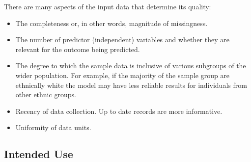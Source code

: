 \documentclass[11pt]{article}
\begin{document}
There are many aspects of the input data that determine its quality: \begin{itemize}
\item The completeness or, in other words, magnitude of missingness. 
\item The number of predictor (independent) variables and whether they are relevant for the outcome being predicted.
\item The degree to which the sample data is inclusive of various subgroups of the wider population. For example, if the majority of the sample group are ethnically white the model may have less reliable results for individuals from other ethnic groups.
\item  Recency of data collection. Up to date records are more informative.
\item Uniformity of data units.
\end{itemize}


\subsection{Intended Use}

\end{document}
